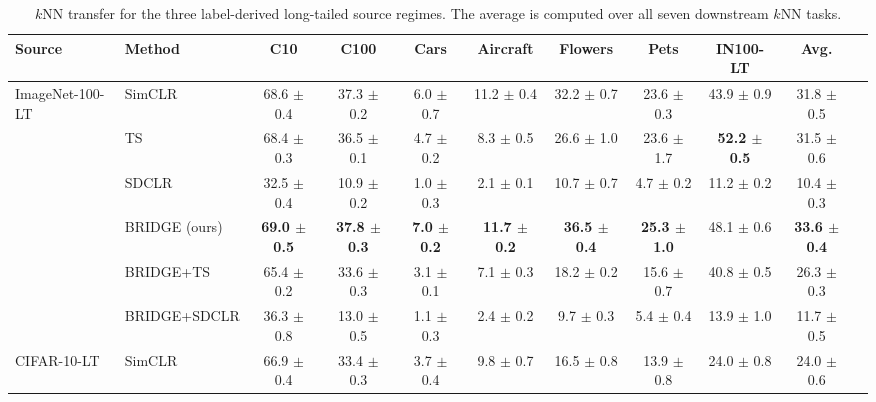 \begin{table}[t]
\centering
\tiny
\setlength{\tabcolsep}{3.0pt}
\caption{$k$NN transfer for the three label-derived long-tailed source regimes. The average is computed over all seven downstream $k$NN tasks.}
\label{tab:main_sota_label_sources_knn}
\begin{adjustbox}{max width=\textwidth}
\begin{tabular}{l l c c c c c c c c c}
\toprule
Source & Method & C10 & C100 & Cars & Aircraft & Flowers & Pets & IN100-LT & Avg. \\
\midrule
ImageNet-100-LT & SimCLR & 68.6 {\scriptsize$\pm$ 0.4} & 37.3 {\scriptsize$\pm$ 0.2} & 6.0 {\scriptsize$\pm$ 0.7} & 11.2 {\scriptsize$\pm$ 0.4} & 32.2 {\scriptsize$\pm$ 0.7} & 23.6 {\scriptsize$\pm$ 0.3} & 43.9 {\scriptsize$\pm$ 0.9} & 31.8 {\scriptsize$\pm$ 0.5} \\
 & TS & 68.4 {\scriptsize$\pm$ 0.3} & 36.5 {\scriptsize$\pm$ 0.1} & 4.7 {\scriptsize$\pm$ 0.2} & 8.3 {\scriptsize$\pm$ 0.5} & 26.6 {\scriptsize$\pm$ 1.0} & 23.6 {\scriptsize$\pm$ 1.7} & \textbf{52.2 {\scriptsize$\pm$ 0.5}} & 31.5 {\scriptsize$\pm$ 0.6} \\
 & SDCLR & 32.5 {\scriptsize$\pm$ 0.4} & 10.9 {\scriptsize$\pm$ 0.2} & 1.0 {\scriptsize$\pm$ 0.3} & 2.1 {\scriptsize$\pm$ 0.1} & 10.7 {\scriptsize$\pm$ 0.7} & 4.7 {\scriptsize$\pm$ 0.2} & 11.2 {\scriptsize$\pm$ 0.2} & 10.4 {\scriptsize$\pm$ 0.3} \\
 & \rowcolor{blue!10} BRIDGE (ours) & \textbf{69.0 {\scriptsize$\pm$ 0.5}} & \textbf{37.8 {\scriptsize$\pm$ 0.3}} & \textbf{7.0 {\scriptsize$\pm$ 0.2}} & \textbf{11.7 {\scriptsize$\pm$ 0.2}} & \textbf{36.5 {\scriptsize$\pm$ 0.4}} & \textbf{25.3 {\scriptsize$\pm$ 1.0}} & 48.1 {\scriptsize$\pm$ 0.6} & \textbf{33.6 {\scriptsize$\pm$ 0.4}} \\
 & BRIDGE+TS & 65.4 {\scriptsize$\pm$ 0.2} & 33.6 {\scriptsize$\pm$ 0.3} & 3.1 {\scriptsize$\pm$ 0.1} & 7.1 {\scriptsize$\pm$ 0.3} & 18.2 {\scriptsize$\pm$ 0.2} & 15.6 {\scriptsize$\pm$ 0.7} & 40.8 {\scriptsize$\pm$ 0.5} & 26.3 {\scriptsize$\pm$ 0.3} \\
 & BRIDGE+SDCLR & 36.3 {\scriptsize$\pm$ 0.8} & 13.0 {\scriptsize$\pm$ 0.5} & 1.1 {\scriptsize$\pm$ 0.3} & 2.4 {\scriptsize$\pm$ 0.2} & 9.7 {\scriptsize$\pm$ 0.3} & 5.4 {\scriptsize$\pm$ 0.4} & 13.9 {\scriptsize$\pm$ 1.0} & 11.7 {\scriptsize$\pm$ 0.5} \\
\midrule
CIFAR-10-LT & SimCLR & 66.9 {\scriptsize$\pm$ 0.4} & 33.4 {\scriptsize$\pm$ 0.3} & 3.7 {\scriptsize$\pm$ 0.4} & 9.8 {\scriptsize$\pm$ 0.7} & 16.5 {\scriptsize$\pm$ 0.8} & 13.9 {\scriptsize$\pm$ 0.8} & 24.0 {\scriptsize$\pm$ 0.8} & 24.0 {\scriptsize$\pm$ 0.6} \\

\end{tabular}
\end{adjustbox}
\end{table}
